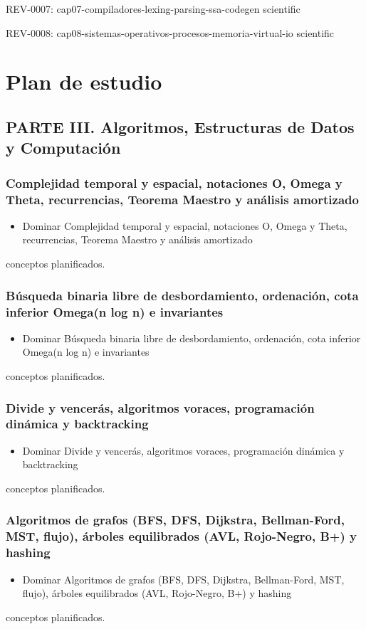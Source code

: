 \documentclass{book}
\begin{document}
\noindent REV-0007: cap07-compiladores-lexing-parsing-ssa-codegen scientific

\noindent REV-0008: cap08-sistemas-operativos-procesos-memoria-virtual-io scientific
\chapter{Plan de estudio}

\section*{PARTE III. Algoritmos, Estructuras de Datos y Computación}

\subsection*{\checkmark Complejidad temporal y espacial, notaciones O, Omega y Theta, recurrencias, Teorema Maestro y análisis amortizado}
\begin{itemize}
\item Dominar Complejidad temporal y espacial, notaciones O, Omega y Theta, recurrencias, Teorema Maestro y análisis amortizado
\end{itemize}
 conceptos planificados.

\subsection*{\checkmark Búsqueda binaria libre de desbordamiento, ordenación, cota inferior Omega(n log n) e invariantes}
\begin{itemize}
\item Dominar Búsqueda binaria libre de desbordamiento, ordenación, cota inferior Omega(n log n) e invariantes
\end{itemize}
 conceptos planificados.

\subsection*{\checkmark Divide y vencerás, algoritmos voraces, programación dinámica y backtracking}
\begin{itemize}
\item Dominar Divide y vencerás, algoritmos voraces, programación dinámica y backtracking
\end{itemize}
 conceptos planificados.

\subsection*{\checkmark Algoritmos de grafos (BFS, DFS, Dijkstra, Bellman-Ford, MST, flujo), árboles equilibrados (AVL, Rojo-Negro, B+) y hashing}
\begin{itemize}
\item Dominar Algoritmos de grafos (BFS, DFS, Dijkstra, Bellman-Ford, MST, flujo), árboles equilibrados (AVL, Rojo-Negro, B+) y hashing
\end{itemize}
 conceptos planificados.
\end{document}
